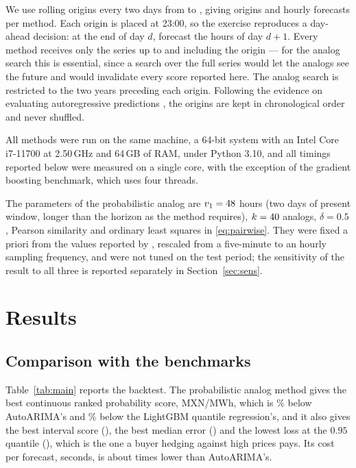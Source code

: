 \documentclass[12pt,a4paper]{article}
\begin{document}
We use rolling origins every two days from \TESTSTART{} to \TESTEND{}, giving
\NORIGINS{} origins and \NFORECASTS{} hourly forecasts per method. Each origin
is placed at 23:00, so the exercise reproduces a day-ahead decision: at the
end of day $d$, forecast the \HORIZON{} hours of day $d+1$. Every method
receives only the series up to and including the origin — for the analog
search this is essential, since a search over the full series would let the
analogs see the future and would invalidate every score reported here. The
analog search is restricted to the two years preceding each origin. Following
the evidence on evaluating autoregressive predictions \citep{Bergmeir2018}, the
origins are kept in chronological order and never shuffled.

All methods were run on the same machine, a 64-bit system with an Intel
Core i7-11700 at 2.50\,GHz and 64\,GB of RAM, under Python 3.10, and all
timings reported below were measured on a single core, with the exception of
the gradient boosting benchmark, which uses four threads.

The parameters of the probabilistic analog are $v_1=48{}$ hours (two days
of present window, longer than the horizon as the method requires),
$k=40{}$ analogs, $\delta=0.5$, Pearson similarity and ordinary least
squares in \eqref{eq:pairwise}. They were fixed a priori from the values
reported by \citet{LezamaLope2023}, rescaled from a five-minute to an hourly
sampling frequency, and were not tuned on the test period; the sensitivity of
the result to all three is reported separately in Section~\ref{sec:sens}.

\section{Results}
\label{sec:results}

\subsection{Comparison with the benchmarks}

Table~\ref{tab:main} reports the backtest. The probabilistic analog method
gives the best continuous ranked probability score, \APCRPS{} MXN/MWh, which is
\CRPSGAINARIMA\% below AutoARIMA's and \CRPSGAINLGBM\% below the LightGBM
quantile regression's, and it also gives the best interval score
(\APWINK{}), the best median error (\APMAE{}) and the lowest loss at the
$0.95$ quantile (\APPINNINETYFIVE{}), which is the one a buyer hedging against high
prices pays. Its cost per forecast, \APTIME{} seconds, is about \SPEEDUP{}
times lower than AutoARIMA's.
\end{document}
